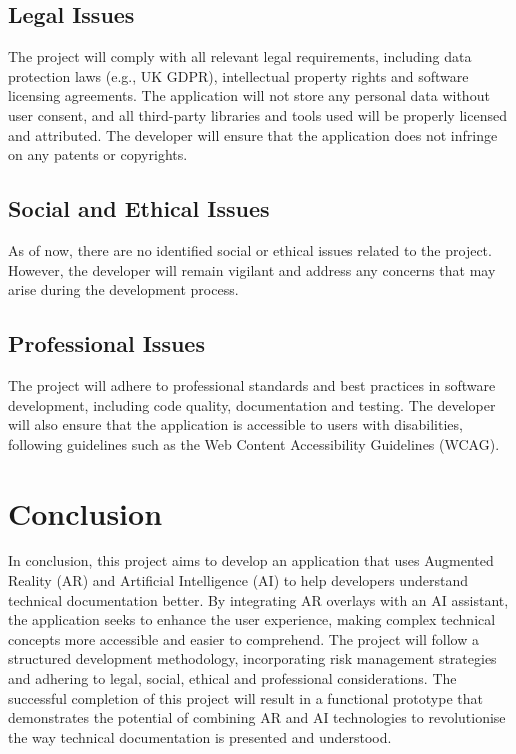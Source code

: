 \documentclass[10pt]{article}
\begin{document}
    \subsection{Legal Issues}
    The project will comply with all relevant legal requirements, including data protection laws (e.g., UK GDPR), intellectual property rights and software licensing agreements. The application
        will not store any personal data without user consent, and all third-party libraries and tools used will be properly licensed and attributed. The developer will ensure that the application does not infringe on any patents or copyrights.

    \subsection{Social and Ethical Issues}
        As of now, there are no identified social or ethical issues related to the project. However, the developer will remain vigilant and address any concerns that may arise during the development process.

    \subsection{Professional Issues}
        The project will adhere to professional standards and best practices in software development, including code quality, documentation and testing. The developer will also ensure that the application is accessible to users with disabilities, following guidelines such as the Web Content Accessibility Guidelines (WCAG).
        
\section{Conclusion}

    In conclusion, this project aims to develop an application that uses Augmented Reality (AR) and Artificial Intelligence (AI) to help developers understand technical documentation better. By
    integrating AR overlays with an AI assistant, the application seeks to enhance the user experience, making complex technical concepts more accessible and easier to comprehend. The project will follow
    a structured development methodology, incorporating risk management strategies and adhering to legal, social, ethical and professional considerations. The successful completion of this project will result
    in a functional prototype that demonstrates the potential of combining AR and AI technologies to revolutionise the way technical documentation is presented and understood.
\end{document}
